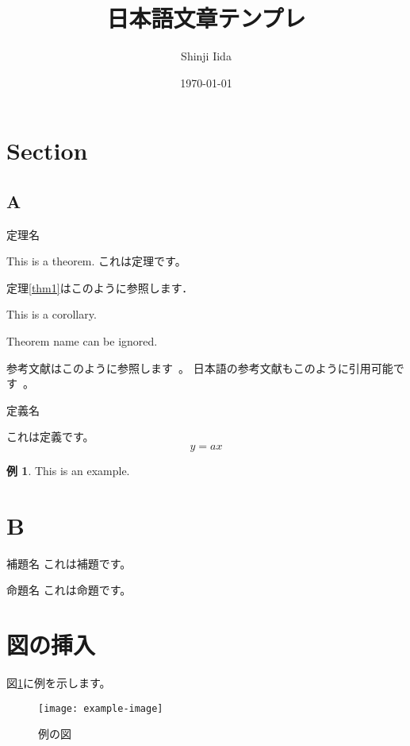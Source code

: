 \documentclass[12pt,dvipdfmx]{jlreq}
\title{日本語文章テンプレ}
\author{Shinji Iida}
\date{\today}
\theoremstyle{definition} %
\newtheorem{ex}{例}[section]
\newenvironment{thm}[2][]{%
  \begin{thmBox}[#1]{#2}{}%
}{%
  \end{thmBox}
}
\newenvironment{dfn}[2][]{
  \begin{dfnBox}[#1]{#2}{}
}{
  \end{dfnBox}
}
\newenvironment{prop}[2][]{
  \begin{propBox}[#1]{#2}{}
}{
  \end{propBox}
}
\newenvironment{lem}[2][]{
  \begin{lemBox}[#1]{#2}{}
}{
  \end{lemBox}
}
\newenvironment{cor}[2][]{
  \begin{corBox}[#1]{#2}{}
}{
  \end{corBox}
}
\begin{document}
\maketitle

\tableofcontents

\section{Section}
\subsection{A}
\begin{thm}[label={thm1}]{定理名}
This is a theorem. これは定理です。
\end{thm}
定理\ref{thm1}はこのように参照します．
\begin{cor}{}
This is a corollary.
\end{cor}

\begin{thm}[label={thm1}]{}
Theorem name can be ignored.
\end{thm}
参考文献はこのように参照します~\cite{Iida2023-sl,Iida2022-qt,Iida2019-xh}。
日本語の参考文献もこのように引用可能です~\cite{2023-xn}。


\begin{dfn}{定義名}
これは定義です。
\begin{equation}
y = ax 
\end{equation}
\end{dfn}

\begin{ex}
This is an example.
\end{ex}

\section{B}
\begin{lem}{補題名}{}
これは補題です。
\end{lem}

\begin{prop}{命題名}{}
これは命題です。
\end{prop}



\section{図の挿入}
図\ref{fig:example}に例を示します。
\begin{figure}[h]
    \centering
    \texttt{[image: example-image]}
    \caption{例の図}
    \label{fig:example}
\end{figure}


%



\end{document}
